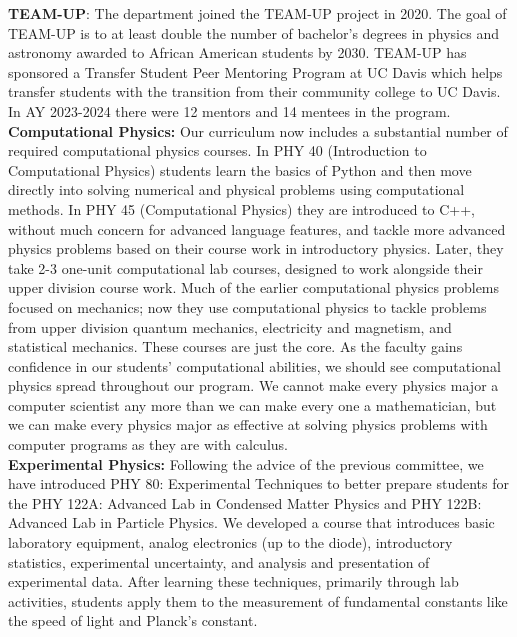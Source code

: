 \documentclass[12pt]{article}
\begin{document}
\noindent
{\bf TEAM-UP}:
The department joined the TEAM-UP project in 2020.  The goal of
TEAM-UP is to at least double the number of bachelor's degrees in
physics and astronomy awarded to African American students by 2030.
TEAM-UP has sponsored a Transfer Student Peer Mentoring Program at UC
Davis which helps transfer students with the transition from their
community college to UC Davis.  In AY 2023-2024 there were 12 mentors
and 14 mentees in the program.\\[3pt]

\noindent
{\bf Computational Physics:} Our curriculum now includes a substantial
number of required computational physics courses.  In PHY 40
(Introduction to Computational Physics) students learn the basics of
Python and then move directly into solving numerical and physical
problems using computational methods.  In PHY 45 (Computational
Physics) they are introduced to C++, without much concern for advanced
language features, and tackle more advanced physics problems based on
their course work in introductory physics.  Later, they take 2-3
one-unit computational lab courses, designed to work alongside their
upper division course work.  Much of the earlier computational physics
problems focused on mechanics; now they use computational physics to
tackle problems from upper division quantum mechanics, electricity and
magnetism, and statistical mechanics. These courses are just the core.
As the faculty gains confidence in our students' computational
abilities, we should see computational physics spread throughout our
program.  We cannot make every physics major a computer scientist any
more than we can make every one a mathematician, but we can make every
physics major as effective at solving physics problems with computer
programs as they are with calculus.\\[3pt]

\noindent
{\bf Experimental Physics:} Following the advice of the previous
committee, we have introduced PHY 80: Experimental Techniques to
better prepare students for the PHY 122A: Advanced Lab in Condensed
Matter Physics and PHY 122B: Advanced Lab in Particle Physics.  We
developed a course that introduces basic laboratory equipment, analog
electronics (up to the diode), introductory statistics, experimental
uncertainty, and analysis and presentation of experimental data.
After learning these techniques, primarily through lab activities,
students apply them to the measurement of fundamental constants like
the speed of light and Planck's constant.
\end{document}
